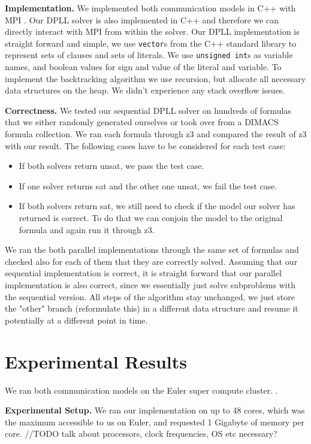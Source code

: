 \documentclass[letterpaper]{article}
\newcommand{\mypar}[1]{{\bf #1.}}
\begin{document}
\mypar{Implementation}
We implemented both communication models in C++ with MPI \cite{mpi}.
Our DPLL solver is also implemented in C++ and therefore we can directly interact with MPI from within the solver.
Our DPLL implementation is straight forward and simple, we use \texttt{vector}s from the C++ standard library to represent sets of clauses and sets of literals.
We use \texttt{unsigned int}s as variable names, and boolean values for sign and value of the literal and variable.
To implement the backtracking algorithm we use recursion, but allocate all necessary data structures on the heap.
We didn't experience any stack overflow issues.

\mypar{Correctness}
We tested our sequential DPLL solver on hundreds of formulas that we either randomly generated ourselves or took over from a DIMACS formula collection. \cite{cnf_website}
We ran each formula through z3 \cite{z3} and compared the result of z3 with our result.
The following cases have to be considered for each test case:
\begin{itemize}
    \item If both solvers return unsat, we pass the test case.
    \item If one solver returns sat and the other one unsat, we fail the test case.
    \item If both solvers return sat, we still need to check if the model our solver has returned is correct.
        To do that we can conjoin the model to the original formula and again run it through z3.
\end{itemize}

We ran the both parallel implementations through the same set of formulas and checked also for each of them that they are correctly solved.
Assuming that our sequential implementation is correct, it is straight forward that our parallel implementation is also correct, since we essentially just solve subproblems with the sequential version.
All steps of the algorithm stay unchanged, we just store the "other" branch (reformulate this) in a different data structure and resume it potentially at a different point in time.


\section{Experimental Results}\label{sec:exp}

We ran both communication models on the Euler super compute cluster. \cite{euler}.

\mypar{Experimental Setup}
We ran our implementation on up to 48 cores, which was the maximum accessible to us on Euler, and requested 1 Gigabyte of memory per core.
//TODO talk about processors, clock frequencies, OS etc necessary?
\end{document}
